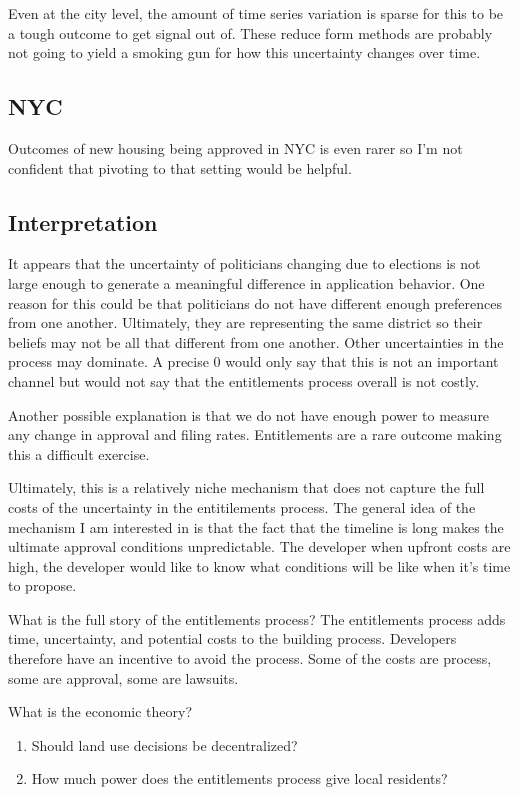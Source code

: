 \documentclass[12pt]{article}
\theoremstyle{definition}
\begin{document}
Even at the city level, the amount of time series variation is sparse for this to be a tough outcome to get signal out of. These reduce form methods are probably not going to yield a smoking gun for how this uncertainty changes over time. 

\subsection{NYC}
Outcomes of new housing being approved in NYC is even rarer so I'm not confident that pivoting to that setting would be helpful. 

\subsection{Interpretation}
It appears that the uncertainty of politicians changing due to elections is not large enough to generate a meaningful difference in application behavior. One reason for this could be that politicians do not have different enough preferences from one another. Ultimately, they are representing the same district so their beliefs may not be all that different from one another. Other uncertainties in the process may dominate. A precise 0 would only say that this is not an important channel but would not say that the entitlements process overall is not costly. 

Another possible explanation is that we do not have enough power to measure any change in approval and filing rates. Entitlements are a rare outcome making this a difficult exercise. 

Ultimately, this is a relatively niche mechanism that does not capture the full costs of the uncertainty in the entitilements process. The general idea of the mechanism I am interested in is that the fact that the timeline is long makes the ultimate approval conditions unpredictable. The developer when upfront costs are high, the developer would like to know what conditions will be like when it's time to propose.  

What is the full story of the entitlements process? The entitlements process adds time, uncertainty, and potential costs to the building process. Developers therefore have an incentive to avoid the process. Some of the costs are process, some are approval, some are lawsuits. 


What is the economic theory? 
\begin{enumerate}
   \item Should land use decisions be decentralized?
   \item How much power does the entitlements process give local residents?
\end{enumerate}
\end{document}
